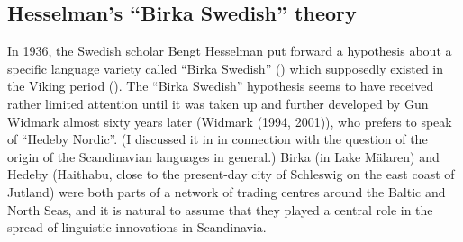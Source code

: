 
\subsection{Hesselman’s “Birka Swedish” theory}
\label{bkm:Ref134938069}
In 1936, the Swedish scholar Bengt Hesselman put forward a hypothesis about a specific language variety called “Birka Swedish” () which supposedly existed in the Viking period (\citet{Hesselman1936}). The “Birka Swedish” hypothesis seems to have received rather limited attention until it was taken up and further developed by Gun Widmark almost sixty years later (Widmark (1994, 2001)), who prefers to speak of “Hedeby Nordic”. (I discussed it in \citet{Dahl2001} in connection with the question of the origin of the Scandinavian languages in general.) Birka (in Lake Mälaren) and Hedeby (Haithabu, close to the present-day city of Schleswig on the east coast of Jutland) were both parts of a network of trading centres around the Baltic and North Seas, and it is natural to assume that they played a central role in the spread of linguistic innovations in Scandinavia. 


